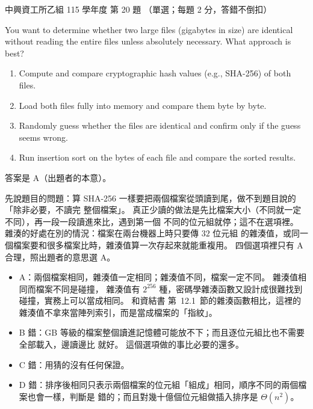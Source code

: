 \begin{pastexam}[label={px:nchu-115-is-20}]{中興資工所乙組 115 學年度 第 20 題}
（單選；每題 2 分，答錯不倒扣）

You want to determine whether two large files (gigabytes in size) are identical without reading
the entire files unless absolutely necessary. What approach is best?
\begin{enumerate}[label=\Alph*.,nosep]
\item Compute and compare cryptographic hash values (e.g., SHA-256) of both files.
\item Load both files fully into memory and compare them byte by byte.
\item Randomly guess whether the files are identical and confirm only if the guess seems wrong.
\item Run insertion sort on the bytes of each file and compare the sorted results.
\end{enumerate}
\end{pastexam}

\begin{pastsoln}
答案是 A（出題者的本意）。

先說題目的問題：算 SHA-256 一樣要把兩個檔案從頭讀到尾，做不到題目說的「除非必要，不讀完
整個檔案」。 真正少讀的做法是先比檔案大小（不同就一定不同），再一段一段讀進來比，遇到第一個
不同的位元組就停；這不在選項裡。 雜湊的好處在別的情況：檔案在兩台機器上時只要傳 $32$ 位元組
的雜湊值，或同一個檔案要和很多檔案比時，雜湊值算一次存起來就能重複用。 四個選項裡只有 A
合理，照出題者的意思選 A。
\begin{itemize}
\item A：兩個檔案相同，雜湊值一定相同；雜湊值不同，檔案一定不同。 雜湊值相同而檔案不同是碰撞，
雜湊值有 $2^{256}$ 種，密碼學雜湊函數又設計成很難找到碰撞，實務上可以當成相同。 和資結書
第~12.1~節的雜湊函數相比，這裡的雜湊值不拿來當陣列索引，而是當成檔案的「指紋」。
\item B 錯：GB 等級的檔案整個讀進記憶體可能放不下；而且逐位元組比也不需要全部載入，邊讀邊比
就好。 這個選項做的事比必要的還多。
\item C 錯：用猜的沒有任何保證。
\item D 錯：排序後相同只表示兩個檔案的位元組「組成」相同，順序不同的兩個檔案也會一樣，判斷是
錯的；而且對幾十億個位元組做插入排序是 $\Theta(n^2)$。
\end{itemize}
\end{pastsoln}
